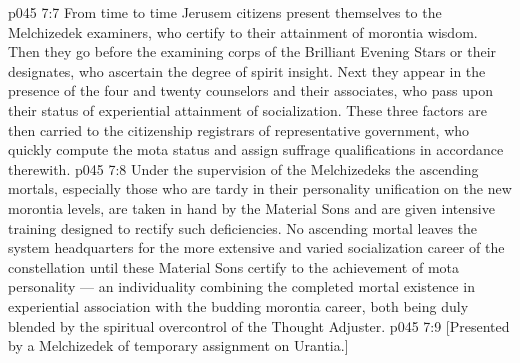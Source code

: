 \vs p045 7:7 From time to time Jerusem citizens present themselves to the Melchizedek examiners, who certify to their attainment of morontia wisdom. Then they go before the examining corps of the Brilliant Evening Stars or their designates, who ascertain the degree of spirit insight. Next they appear in the presence of the four and twenty counselors and their associates, who pass upon their status of experiential attainment of socialization. These three factors are then carried to the citizenship registrars of representative government, who quickly compute the mota status and assign suffrage qualifications in accordance therewith.
\vs p045 7:8 \pc Under the supervision of the Melchizedeks the ascending mortals, especially those who are tardy in their personality unification on the new morontia levels, are taken in hand by the Material Sons and are given intensive training designed to rectify such deficiencies. No ascending mortal leaves the system headquarters for the more extensive and varied socialization career of the constellation until these Material Sons certify to the achievement of mota personality --- an individuality combining the completed mortal existence in experiential association with the budding morontia career, both being duly blended by the spiritual overcontrol of the Thought Adjuster.
\vsetoff
\vs p045 7:9 [Presented by a Melchizedek of temporary assignment on Urantia.]
